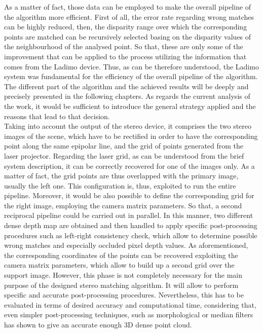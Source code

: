 As a matter of fact, those data can be employed to make the overall pipeline of the algorithm more efficient. 
First of all, the error rate regarding wrong matches can be highly reduced, then, the disparity range over which the corresponding points are matched can be recursively selected basing on the disparity values of the neighbourhood of the analysed point. 
So that, these are only some of the improvement that can be applied to the process utilizing the information that comes from the Ladimo device.
Thus, as can be therefore understood, the Ladimo system was fundamental for the efficiency of the overall pipeline of the algorithm.
The different part of the algorithm and the achieved results will be deeply and precisely presented in the following chapters. 
As regards the current analysis of the work, it would be sufficient to introduce the general strategy applied and the reasons that lead to that decision.\\
Taking into account the output of the stereo device, it comprises the two stereo images of the scene, which have to be rectified in order to have the corresponding point along the same epipolar line, and the grid of points generated from the laser projector. 
Regarding the laser grid, as can be understood from the brief system description, it can be correctly recovered for one of the images only. 
As a matter of fact, the grid points are thus overlapped with the primary image, usually the left one. 
This configuration is, thus, exploited to run the entire pipeline. 
Moreover, it would be also possible to define the corresponding grid for the right image, employing the camera matrix parameters. 
So that, a second reciprocal pipeline could be carried out in parallel. 
In this manner, two different dense depth map are obtained and then handled to apply specific post-processing procedures such as left-right consistency check, which allow to determine possible wrong matches and especially occluded pixel depth values. 
As aforementioned, the corresponding coordinates of the points can be recovered exploiting the camera matrix parameters, which allow to build up a second grid over the support image. 
However, this phase is not completely necessary for the main purpose of the designed stereo matching algorithm.
It will allow to perform specific and accurate post-processing procedures. 
Nevertheless, this has to be evaluated in terms of desired accuracy and computational time, considering that, even simpler post-processing techniques, such as morphological or median filters has shown to give an accurate enough 3D dense point cloud.\\


